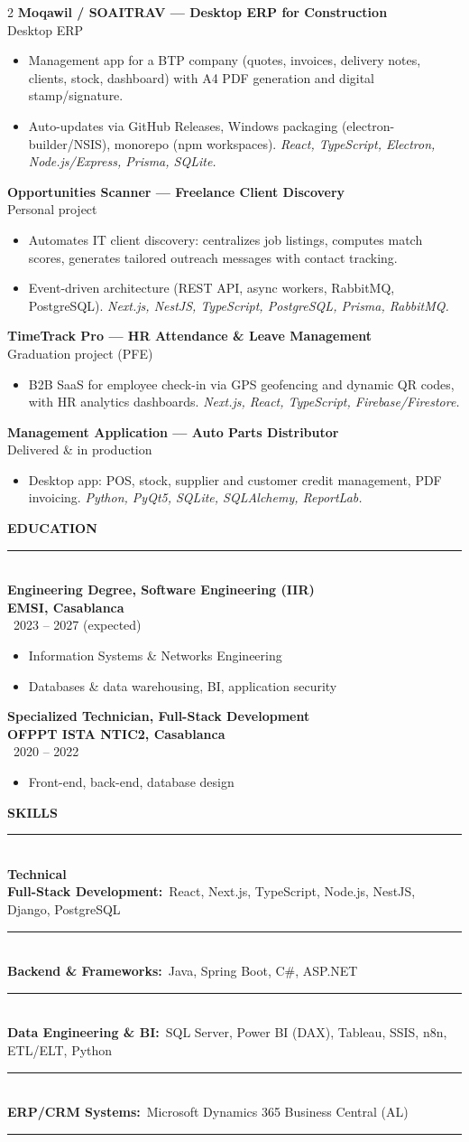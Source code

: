 \documentclass[10pt,a4paper]{article}
\newcommand{\sectiontitle}[1]{%
  \vspace{5pt}%
  {\bfseries\color{ink}\normalsize\MakeUppercase{#1}}\\[-1pt]
  {\color{ink}\rule{\linewidth}{1pt}}\\[4pt]
}
\newcommand{\project}[2]{%
  \vspace{4pt}%
  {\bfseries\color{ink}\small #1}\\[0.5pt]
  {\footnotesize\color{subtext}#2}\\[2pt]
}
\newcommand{\resumeItems}[1]{%
  \begin{itemize}[leftmargin=10pt, itemsep=0.5pt, topsep=0.5pt, parsep=0pt,
                   label={\scriptsize\textcolor{accent}{\textbullet}}]
    #1
  \end{itemize}
}
\newcommand{\tech}[1]{{\footnotesize\textit{#1}}}
\newcommand{\skillCat}[2]{%
  {\bfseries\footnotesize #1:}\ {\footnotesize #2}\\[1pt]
  {\color{rule}\rule{\linewidth}{0.35pt}}\\[3pt]
}
\newcommand{\edu}[4]{%
  \vspace{3pt}%
  {\bfseries\color{ink}\small #1}\\[0.5pt]
  {\bfseries\color{accent}\small #2}\\[1.5pt]
  {\footnotesize\color{subtext}\faCalendarAlt\ #3}\\[2pt]
  #4
}
\begin{document}
\begin{paracol}{2}
\project{Moqawil / SOAITRAV --- Desktop ERP for Construction}{Desktop ERP}
\resumeItems{
  \item Management app for a BTP company (quotes, invoices, delivery notes, clients, stock, dashboard) with A4 PDF generation and digital stamp/signature.
  \item Auto-updates via GitHub Releases, Windows packaging (electron-builder/NSIS), monorepo (npm workspaces). \tech{React, TypeScript, Electron, Node.js/Express, Prisma, SQLite.}
}

\project{Opportunities Scanner --- Freelance Client Discovery}{Personal project}
\resumeItems{
  \item Automates IT client discovery: centralizes job listings, computes match scores, generates tailored outreach messages with contact tracking.
  \item Event-driven architecture (REST API, async workers, RabbitMQ, PostgreSQL). \tech{Next.js, NestJS, TypeScript, PostgreSQL, Prisma, RabbitMQ.}
}

\project{TimeTrack Pro --- HR Attendance \& Leave Management}{Graduation project (PFE)}
\resumeItems{
  \item B2B SaaS for employee check-in via GPS geofencing and dynamic QR codes, with HR analytics dashboards. \tech{Next.js, React, TypeScript, Firebase/Firestore.}
}

\project{Management Application --- Auto Parts Distributor}{Delivered \& in production}
\resumeItems{
  \item Desktop app: POS, stock, supplier and customer credit management, PDF invoicing. \tech{Python, PyQt5, SQLite, SQLAlchemy, ReportLab.}
}

\switchcolumn

\sectiontitle{Education}

\edu{Engineering Degree, Software Engineering (IIR)}{EMSI, Casablanca}{2023 -- 2027 (expected)}{%
  \resumeItems{
    \item Information Systems \& Networks Engineering
    \item Databases \& data warehousing, BI, application security
  }
}

\edu{Specialized Technician, Full-Stack Development}{OFPPT ISTA NTIC2, Casablanca}{2020 -- 2022}{%
  \resumeItems{
    \item Front-end, back-end, database design
  }
}

\sectiontitle{Skills}

{\bfseries\small\color{accent} Technical}\\[3pt]
\skillCat{Full-Stack Development}{React, Next.js, TypeScript, Node.js, NestJS, Django, PostgreSQL}
\skillCat{Backend \& Frameworks}{Java, Spring Boot, C\#, ASP.NET}
\skillCat{Data Engineering \& BI}{SQL Server, Power BI (DAX), Tableau, SSIS, n8n, ETL/ELT, Python}
\skillCat{ERP/CRM Systems}{Microsoft Dynamics 365 Business Central (AL)}


\end{paracol}
\end{document}
